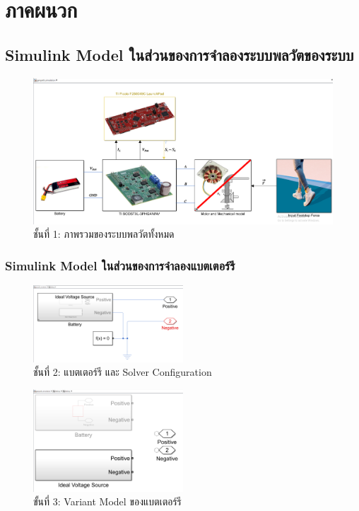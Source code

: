 \documentclass[11pt,a4paper]{article}
\begin{document}
\section{ภาคผนวก}

\subsection{Simulink Model ในส่วนของการจำลองระบบพลวัตของระบบ}

\begin{figure}[H]
    \centering
    \includegraphics[width=\textwidth]{layer0.png}
    \caption{ชั้นที่ 1: ภาพรวมของระบบพลวัตทั้งหมด}
\end{figure}

\subsubsection{Simulink Model ในส่วนของการจำลองแบตเตอร์รี}

\begin{figure}[H]
    \centering
    \includegraphics[width=0.5\textwidth]{layer1.png}
    \caption{ชั้นที่ 2: แบตเตอร์รี และ Solver Configuration}
\end{figure}

\begin{figure}[H]
    \centering
    \includegraphics[width=0.5\textwidth]{layer2-1.png}
    \caption{ขั้นที่ 3: Variant Model ของแบตเตอร์รี}
\end{figure}
\end{document}
